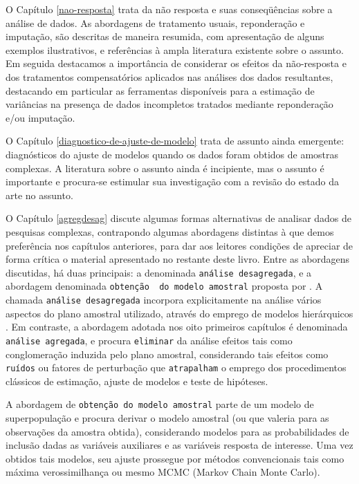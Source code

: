 \documentclass[]{book}
\theoremstyle{definition}
\theoremstyle{definition}
\theoremstyle{definition}
\theoremstyle{remark}
\begin{document}
O Capítulo \ref{nao-resposta} trata da não resposta e suas conseqüências
sobre a análise de dados. As abordagens de tratamento usuais,
reponderação e imputação, são descritas de maneira resumida, com
apresentação de alguns exemplos ilustrativos, e referências à ampla
literatura existente sobre o assunto. Em seguida destacamos a
importância de considerar os efeitos da não-resposta e dos tratamentos
compensatórios aplicados nas análises dos dados resultantes, destacando
em particular as ferramentas disponíveis para a estimação de variâncias
na presença de dados incompletos tratados mediante reponderação e/ou
imputação.

O Capítulo \ref{diagnostico-de-ajuste-de-modelo} trata de assunto ainda
emergente: diagnósticos do ajuste de modelos quando os dados foram
obtidos de amostras complexas. A literatura sobre o assunto ainda é
incipiente, mas o assunto é importante e procura-se estimular sua
investigação com a revisão do estado da arte no assunto.

O Capítulo \ref{agregdesag} discute algumas formas alternativas de
analisar dados de pesquisas complexas, contrapondo algumas abordagens
distintas à que demos preferência nos capítulos anteriores, para dar aos
leitores condições de apreciar de forma crítica o material apresentado
no restante deste livro. Entre as abordagens discutidas, há duas
principais: a denominada \texttt{análise\ desagregada}, e a abordagem
denominada \texttt{obtenção\ \ do\ modelo\ amostral} proposta por
\citep{PKR}. A chamada \texttt{análise\ desagregada} incorpora
explicitamente na análise vários aspectos do plano amostral utilizado,
através do emprego de modelos hierárquicos \citep{bryk}. Em contraste, a
abordagem adotada nos oito primeiros capítulos é denominada
\texttt{análise\ agregada}, e procura \texttt{eliminar} da análise
efeitos tais como conglomeração induzida pelo plano amostral,
considerando tais efeitos como \texttt{ruídos} ou fatores de perturbação
que \texttt{atrapalham} o emprego dos procedimentos clássicos de
estimação, ajuste de modelos e teste de hipóteses.

A abordagem de \texttt{obtenção\ do\ modelo\ amostral} parte de um
modelo de superpopulação e procura derivar o modelo amostral (ou que
valeria para as observações da amostra obtida), considerando modelos
para as probabilidades de inclusão dadas as variáveis auxiliares e as
variáveis resposta de interesse. Uma vez obtidos tais modelos, seu
ajuste prossegue por métodos convencionais tais como máxima
verossimilhança ou mesmo MCMC (Markov Chain Monte Carlo).
\end{document}
